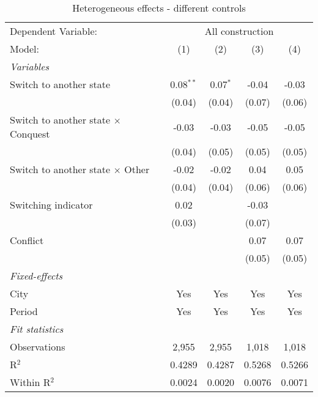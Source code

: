 \begin{table}[htbp]
   \caption{\label{tab:controls_100y} Heterogeneous effects - different controls}
   \centering
   \begin{tabular}{lcccc}
      \tabularnewline \midrule \midrule
      Dependent Variable: & \multicolumn{4}{c}{All construction}\\
      Model:                                     & (1)         & (2)        & (3)    & (4)\\  
      \midrule
      \emph{Variables}\\
      Switch to another state                    & 0.08$^{**}$ & 0.07$^{*}$ & -0.04  & -0.03\\   
                                                 & (0.04)      & (0.04)     & (0.07) & (0.06)\\   
      Switch to another state $\times$ Conquest  & -0.03       & -0.03      & -0.05  & -0.05\\   
                                                 & (0.04)      & (0.05)     & (0.05) & (0.05)\\   
      Switch to another state $\times$ Other     & -0.02       & -0.02      & 0.04   & 0.05\\   
                                                 & (0.04)      & (0.04)     & (0.06) & (0.06)\\   
      Switching indicator                        & 0.02        &            & -0.03  &   \\   
                                                 & (0.03)      &            & (0.07) &   \\   
      Conflict                                   &             &            & 0.07   & 0.07\\   
                                                 &             &            & (0.05) & (0.05)\\   
      \midrule
      \emph{Fixed-effects}\\
      City                                       & Yes         & Yes        & Yes    & Yes\\  
      Period                                     & Yes         & Yes        & Yes    & Yes\\  
      \midrule
      \emph{Fit statistics}\\
      Observations                               & 2,955       & 2,955      & 1,018  & 1,018\\  
      R$^2$                                      & 0.4289      & 0.4287     & 0.5268 & 0.5266\\  
      Within R$^2$                               & 0.0024      & 0.0020     & 0.0076 & 0.0071\\  
      \midrule \midrule
      

\end{tabular}
\end{table}
